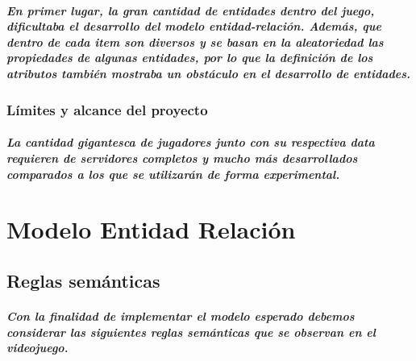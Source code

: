 \documentclass{report}
\begin{document}
\paragraph{En primer lugar, la gran cantidad de entidades dentro del juego, dificultaba el desarrollo del modelo entidad-relación. Además, que dentro de cada item son diversos y se basan en la aleatoriedad las propiedades de algunas entidades, por lo que la definición de los atributos también mostraba un obstáculo en el desarrollo de entidades.}

\subsection{Límites y alcance del proyecto}
\paragraph{La cantidad gigantesca de jugadores junto con su respectiva data requieren de servidores completos y mucho más desarrollados comparados a los que se utilizarán de forma experimental.}

\chapter{Modelo Entidad Relación}
\section{Reglas semánticas}
\paragraph{Con la finalidad de implementar el modelo esperado debemos considerar las siguientes reglas semánticas que se observan en el videojuego.}
\end{document}
